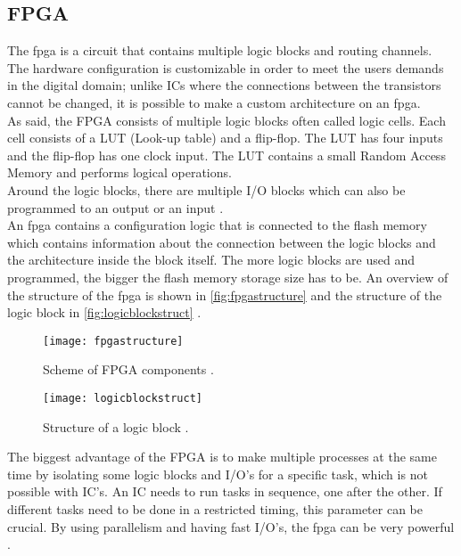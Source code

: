 \subsection{FPGA}


The \gls{fpga} is a circuit that contains multiple logic blocks and routing channels.\\
The hardware configuration is customizable in order to meet the users demands in the digital domain; unlike ICs where the connections between the transistors cannot be changed, it is possible to make a custom architecture on an \gls{fpga}.  \\
As said, the FPGA consists of multiple logic blocks often called logic cells. Each cell consists of a LUT (Look-up table) and a flip-flop. The LUT has four inputs and the flip-flop has one clock input. The LUT contains a small Random Access Memory and performs logical operations. \\
Around the logic blocks, there are multiple I/O blocks which can also be programmed to an output or an input \citep {FPGA_youtube} \citep{FPGA_center} \citep{FPGA_toronto}.  \\
An \gls{fpga} contains a configuration logic that is connected to the flash memory which contains information about the connection between the logic blocks and the architecture inside the block itself. The more logic blocks are used and programmed, the bigger the flash memory storage size has to be. An overview of the structure of the \gls{fpga} is shown in \autoref{fig:fpgastructure} and the structure of the logic block in \autoref{fig:logicblockstruct} \citep {FPGA_youtube} \citep{FPGA_center} \citep{FPGA_toronto}.  \\
\newline

\begin{figure}[htbp]
	\centering
	\texttt{[image: fpgastructure]}
	\caption{Scheme of FPGA components \citep{FPGA_toronto}.}
	\label{fig:fpgastructure}
\end{figure}

\begin{figure}[htbp]
	\centering
	\texttt{[image: logicblockstruct]}
	\caption{Structure of a logic block \citep{FPGA_toronto}.}
	\label{fig:logicblockstruct}
\end{figure}


The biggest advantage of the FPGA is to make multiple processes at the same time by isolating some logic blocks and I/O's for a specific task, which is not possible with IC's. An IC needs to run tasks in sequence, one after the other. If different tasks need to be done in a restricted timing, this parameter can be crucial. 
By using parallelism and having fast I/O's, the \gls{fpga} can be very powerful \citep {FPGA_youtube} \citep{FPGA_center} \citep{FPGA_toronto}. \\

